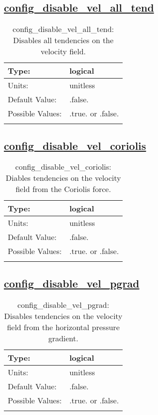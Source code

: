 \subsection[config\_disable\_vel\_all\_tend]{\hyperref[sec:nm_tab_debug]{config\_disable\_vel\_all\_tend}}
\label{subsec:nm_sec_config_disable_vel_all_tend}
\begin{center}
\begin{longtable}{| p{2.0in} || p{4.0in} |}
    \hline
    Type: & logical \\
    \hline
    Units: & \si{unitless} \\
    \hline
    Default Value: & .false. \\
    \hline
    Possible Values: & .true. or .false. \\
    \hline
    \caption{config\_disable\_vel\_all\_tend: Disables all tendencies on the velocity field.}
\end{longtable}
\end{center}
\subsection[config\_disable\_vel\_coriolis]{\hyperref[sec:nm_tab_debug]{config\_disable\_vel\_coriolis}}
\label{subsec:nm_sec_config_disable_vel_coriolis}
\begin{center}
\begin{longtable}{| p{2.0in} || p{4.0in} |}
    \hline
    Type: & logical \\
    \hline
    Units: & \si{unitless} \\
    \hline
    Default Value: & .false. \\
    \hline
    Possible Values: & .true. or .false. \\
    \hline
    \caption{config\_disable\_vel\_coriolis: Diables tendencies on the velocity field from the Coriolis force.}
\end{longtable}
\end{center}
\subsection[config\_disable\_vel\_pgrad]{\hyperref[sec:nm_tab_debug]{config\_disable\_vel\_pgrad}}
\label{subsec:nm_sec_config_disable_vel_pgrad}
\begin{center}
\begin{longtable}{| p{2.0in} || p{4.0in} |}
    \hline
    Type: & logical \\
    \hline
    Units: & \si{unitless} \\
    \hline
    Default Value: & .false. \\
    \hline
    Possible Values: & .true. or .false. \\
    \hline
    \caption{config\_disable\_vel\_pgrad: Disables tendencies on the velocity field from the horizontal pressure gradient.}
\end{longtable}
\end{center}
